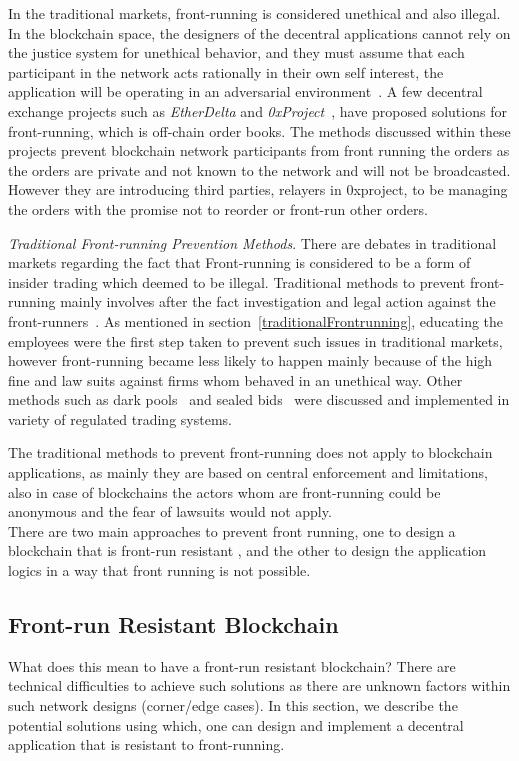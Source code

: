 In the traditional markets, front-running is considered unethical and also illegal. In the blockchain space, the designers of the decentral applications cannot rely on the justice system for unethical behavior, and they must assume that each participant in the network acts rationally in their own self interest, the application will be operating in an adversarial environment~\cite{0xfrontrunning:online}.
A few decentral exchange projects such as \textit{EtherDelta} and \textit{0xProject}~\cite{warren20170x}, have proposed solutions for front-running, which is off-chain order books. The methods discussed within these projects prevent blockchain network participants from front running the orders as the orders are private and not known to the network and will not be broadcasted. However they are introducing third parties, \eg relayers in 0xproject, to be managing the orders with the promise not to reorder or front-run other orders. 

\emph{Traditional Front-running Prevention Methods}. There are debates in traditional markets regarding the fact that Front-running is considered to be a form of insider trading which deemed to be illegal. Traditional methods to prevent front-running mainly involves after the fact investigation and legal action against the front-runners~\cite{LexisNexisLawSuit}. As mentioned in section~\ref{traditionalFrontrunning}, educating the employees were the first step taken to prevent such issues in traditional markets, however front-running became less likely to happen mainly because of the high fine and law suits against firms whom behaved in an unethical way. Other methods such as dark pools~\cite{zhu2014dark, buti2011diving} and sealed bids~\cite{radner1989sealed} were discussed and implemented in variety of regulated trading systems. 

The traditional methods to prevent front-running does not apply to blockchain applications, as mainly they are based on central enforcement and limitations, also in case of blockchains the actors whom are front-running could be anonymous and the fear of lawsuits would not apply. \\

There are two main approaches to prevent front running, one to design a blockchain that is front-run resistant , and the other to design the application logics in a way that front running is not possible. 
\subsection{Front-run Resistant Blockchain}
What does this mean to have a front-run resistant blockchain?  There are technical difficulties to achieve such solutions as there are unknown factors within such network designs (corner/edge cases). In this section, we describe the potential solutions using which, one can design and implement a decentral application that is resistant to front-running.

